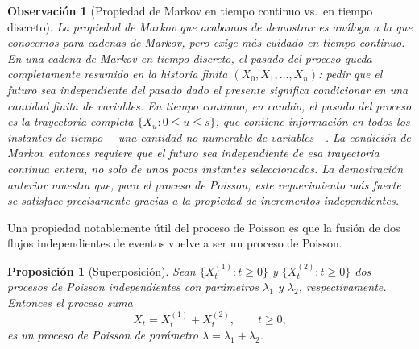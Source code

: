 \documentclass[12pt]{book}
\newtheorem{proposition}{Proposición}[chapter]
\newtheorem{remark}{Observación}[chapter]
\begin{document}
\begin{remark}[Propiedad de Markov en tiempo continuo vs.\ en tiempo discreto]
La propiedad de Markov que acabamos de demostrar es análoga a la que conocemos para cadenas de Markov, pero exige más cuidado en tiempo continuo. En una cadena de Markov en tiempo discreto, el pasado del proceso queda completamente resumido en la historia finita $(X_0, X_1, \ldots, X_n)$: pedir que el futuro sea independiente del pasado dado el presente significa condicionar en una cantidad finita de variables. En tiempo continuo, en cambio, el pasado del proceso es la trayectoria completa $\{X_u : 0 \le u \le s\}$, que contiene información en \emph{todos} los instantes de tiempo —una cantidad no numerable de variables—. La condición de Markov entonces requiere que el futuro sea independiente de esa trayectoria continua entera, no solo de unos pocos instantes seleccionados. La demostración anterior muestra que, para el proceso de Poisson, este requerimiento más fuerte se satisface precisamente gracias a la propiedad de incrementos independientes.
\end{remark}


Una propiedad notablemente útil del proceso de Poisson es que la fusión de dos flujos independientes de eventos vuelve a ser un proceso de Poisson.

\begin{proposition}[Superposición]
Sean $\{X_t^{(1)} : t \ge 0\}$ y $\{X_t^{(2)} : t \ge 0\}$ dos procesos de Poisson independientes con parámetros $\lambda_1$ y $\lambda_2$, respectivamente. Entonces el proceso suma
\[
    X_t = X_t^{(1)} + X_t^{(2)}, \qquad t \ge 0,
\]
es un proceso de Poisson de parámetro $\lambda = \lambda_1 + \lambda_2$.
\end{proposition}
\end{document}
